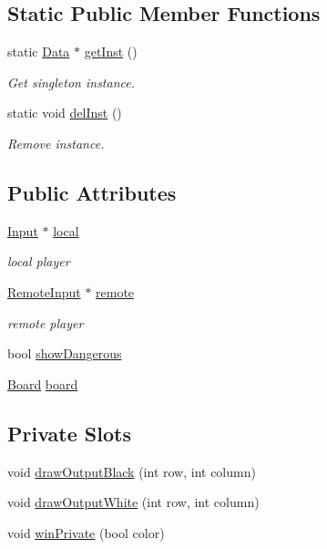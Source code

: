 \subsection*{Static Public Member Functions}
\begin{DoxyCompactItemize}
\item 
static \hyperlink{classData}{Data} $\ast$ \hyperlink{classData_ad35a80f2a296e08d9ff81444566570f5}{get\+Inst} ()
\begin{DoxyCompactList}\small\item\em Get singleton instance. \end{DoxyCompactList}\item 
static void \hyperlink{classData_a28e9f57b4cff7a6fe1058defc0ccac08}{del\+Inst} ()
\begin{DoxyCompactList}\small\item\em Remove instance. \end{DoxyCompactList}\end{DoxyCompactItemize}
\subsection*{Public Attributes}
\begin{DoxyCompactItemize}
\item 
\hyperlink{classInput}{Input} $\ast$ \hyperlink{classData_a66242713cb93b680f847231ee57457bd}{local}
\begin{DoxyCompactList}\small\item\em local player \end{DoxyCompactList}\item 
\hyperlink{classRemoteInput}{Remote\+Input} $\ast$ \hyperlink{classData_ab1b9a7098b7d41fdab0366b2a9c660ed}{remote}
\begin{DoxyCompactList}\small\item\em remote player \end{DoxyCompactList}\item 
bool \hyperlink{classData_a2909d285f3adfe5a61c8ea181cd7824c}{show\+Dangerous}
\item 
\hyperlink{classBoard}{Board} \hyperlink{classData_aa932fae932d34b82666a9b56e1c36f8c}{board}
\end{DoxyCompactItemize}
\subsection*{Private Slots}
\begin{DoxyCompactItemize}
\item 
void \hyperlink{classData_a85f3f284e7f73ab815b2dd2cd10d774f}{draw\+Output\+Black} (int row, int column)
\item 
void \hyperlink{classData_add002ff89ac45f63df4dfe2f873d5756}{draw\+Output\+White} (int row, int column)
\item 
void \hyperlink{classData_a5272d4ddc3263564cd13f47d609ab8b8}{win\+Private} (bool color)
\end{DoxyCompactItemize}
